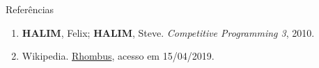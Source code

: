 \begin{frame}[fragile]{Referências}

    \begin{enumerate}
        \item \textbf{HALIM}, Felix; \textbf{HALIM}, Steve. \textit{Competitive Programming 3}, 2010.

        \item Wikipedia. \href{https://en.wikipedia.org/wiki/Rhombus}{Rhombus}, acesso em 15/04/2019.

    \end{enumerate}

\end{frame}
